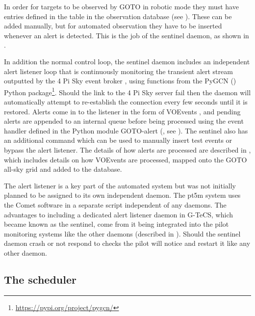 \begin{colsection}
\begin{colsection}
In order for targets to be observed by GOTO in robotic mode they must have entries defined in the  table in the observation database (see ). These can be added manually, but for automated observation they have to be inserted whenever an alert is detected. This is the job of the sentinel daemon, as shown in .

In addition the normal control loop, the sentinel daemon includes an independent alert listener loop that is continuously monitoring the transient alert stream outputted by the 4 Pi Sky event broker \citep{4pisky}, using functions from the PyGCN () Python package\footnote{\url{https://pypi.org/project/pygcn/}}. Should the link to the 4 Pi Sky server fail then the daemon will automatically attempt to re-establish the connection every few seconds until it is restored. Alerts come in to the listener in the form of VOEvents \citep{voevent}, and pending alerts are appended to an internal queue before being processed using the event handler defined in the Python module GOTO-alert (, see ). The sentinel also has an additional  command which can be used to manually insert test events or bypass the alert listener. The details of how alerts are processed are described in , which includes details on how VOEvents are processed, mapped onto the GOTO all-sky grid and added to the database.

The alert listener is a key part of the automated system but was not initially planned to be assigned to its own independent daemon. The \gls{pt5m} system uses the Comet software \citep{comet} in a separate script independent of any daemons. The advantages to including a dedicated alert listener daemon in G-TeCS, which became known as the sentinel, come from it being integrated into the pilot monitoring systems like the other daemons (described in ). Should the sentinel daemon crash or not respond to checks the pilot will notice and restart it like any other daemon.

\end{colsection}


\subsection{The scheduler}
\label{sec:scheduler}
\begin{colsection}


\end{colsection}
\end{colsection}
